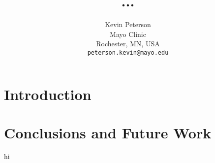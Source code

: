 \documentclass[12pt]{proc}
\title{...}
\author{Kevin Peterson\\
\small Mayo Clinic\\
\small Rochester, MN, USA\\
\small \texttt{peterson.kevin@mayo.edu}\\
}
\begin{document}
\maketitle

\begin{abstract}

\end{abstract}

\section{Introduction}

\section{Conclusions and Future Work}



hi\cite{lakhani2003open}
\end{document}
